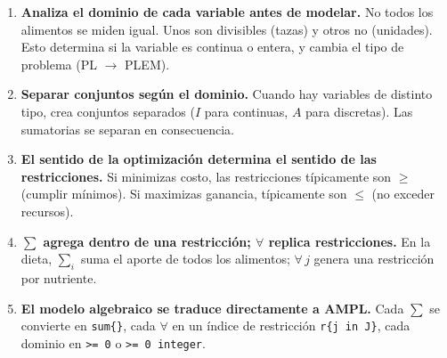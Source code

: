 \documentclass[12pt]{article}
\begin{document}
\begin{enumerate}[label=\textbf{\arabic*.}]
    \item \textbf{Analiza el dominio de cada variable antes de modelar.} No todos los alimentos se miden igual. Unos son divisibles (tazas) y otros no (unidades). Esto determina si la variable es continua o entera, y cambia el tipo de problema (PL $\to$ PLEM).

    \item \textbf{Separar conjuntos seg\'un el dominio.} Cuando hay variables de distinto tipo, crea conjuntos separados ($I$ para continuas, $A$ para discretas). Las sumatorias se separan en consecuencia.

    \item \textbf{El sentido de la optimizaci\'on determina el sentido de las restricciones.} Si minimizas costo, las restricciones t\'ipicamente son $\geq$ (cumplir m\'inimos). Si maximizas ganancia, t\'ipicamente son $\leq$ (no exceder recursos).

    \item \textbf{$\sum$ agrega dentro de una restricci\'on; $\forall$ replica restricciones.} En la dieta, $\sum_i$ suma el aporte de todos los alimentos; $\forall\, j$ genera una restricci\'on por nutriente.

    \item \textbf{El modelo algebraico se traduce directamente a AMPL.} Cada $\sum$ se convierte en \texttt{sum\{\}}, cada $\forall$ en un \'indice de restricci\'on \texttt{r\{j in J\}}, cada dominio en \texttt{>= 0} o \texttt{>= 0 integer}.
\end{enumerate}
\end{document}
